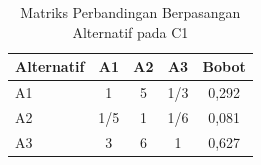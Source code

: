 \begin{table}[h]
\centering
\caption{Matriks Perbandingan Berpasangan Alternatif pada C1}
\label{tab:ahp-alt-c1}
\begin{tabular}{|l|c|c|c|c|}
\hline
\textbf{Alternatif} & \textbf{A1} & \textbf{A2} & \textbf{A3} & \textbf{Bobot} \\
\hline
A1       & 1     & 5     & 1/3   & 0,292 \\
A2       & 1/5   & 1     & 1/6   & 0,081 \\
A3       & 3     & 6     & 1     & 0,627 \\
\hline
\end{tabular}
\end{table}